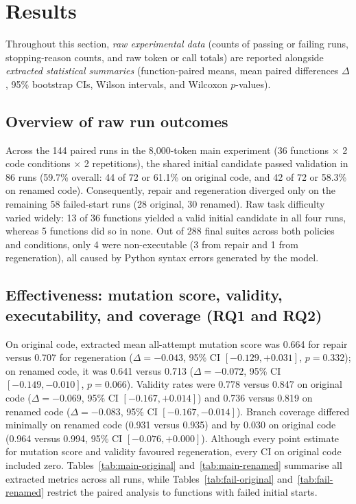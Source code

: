 \documentclass[11pt,a4paper]{article}
\begin{document}
\section{Results}
Throughout this section, \emph{raw experimental data} (counts of passing or failing runs, stopping-reason counts, and raw token or call totals) are reported alongside \emph{extracted statistical summaries} (function-paired means, mean paired differences $\Delta$, 95\% bootstrap CIs, Wilson intervals, and Wilcoxon $p$-values).

\subsection{Overview of raw run outcomes}
Across the 144 paired runs in the 8{,}000-token main experiment (36 functions $\times$ 2 code conditions $\times$ 2 repetitions), the shared initial candidate passed validation in 86 runs (59.7\% overall: 44 of 72 or 61.1\% on original code, and 42 of 72 or 58.3\% on renamed code). Consequently, repair and regeneration diverged only on the remaining 58 failed-start runs (28 original, 30 renamed). Raw task difficulty varied widely: 13 of 36 functions yielded a valid initial candidate in all four runs, whereas 5 functions did so in none. Out of 288 final suites across both policies and conditions, only 4 were non-executable (3 from repair and 1 from regeneration), all caused by Python syntax errors generated by the model.

\subsection{Effectiveness: mutation score, validity, executability, and coverage (RQ1 and RQ2)}
On original code, extracted mean all-attempt mutation score was 0.664 for repair versus 0.707 for regeneration ($\Delta = -0.043$, 95\% CI $[-0.129, +0.031]$, $p = 0.332$); on renamed code, it was 0.641 versus 0.713 ($\Delta = -0.072$, 95\% CI $[-0.149, -0.010]$, $p = 0.066$). Validity rates were 0.778 versus 0.847 on original code ($\Delta = -0.069$, 95\% CI $[-0.167, +0.014]$) and 0.736 versus 0.819 on renamed code ($\Delta = -0.083$, 95\% CI $[-0.167, -0.014]$). Branch coverage differed minimally on renamed code (0.931 versus 0.935) and by 0.030 on original code (0.964 versus 0.994, 95\% CI $[-0.076, +0.000]$). Although every point estimate for mutation score and validity favoured regeneration, every CI on original code included zero. Tables~\ref{tab:main-original} and~\ref{tab:main-renamed} summarise all extracted metrics across all runs, while Tables~\ref{tab:fail-original} and~\ref{tab:fail-renamed} restrict the paired analysis to functions with failed initial starts.
\end{document}
